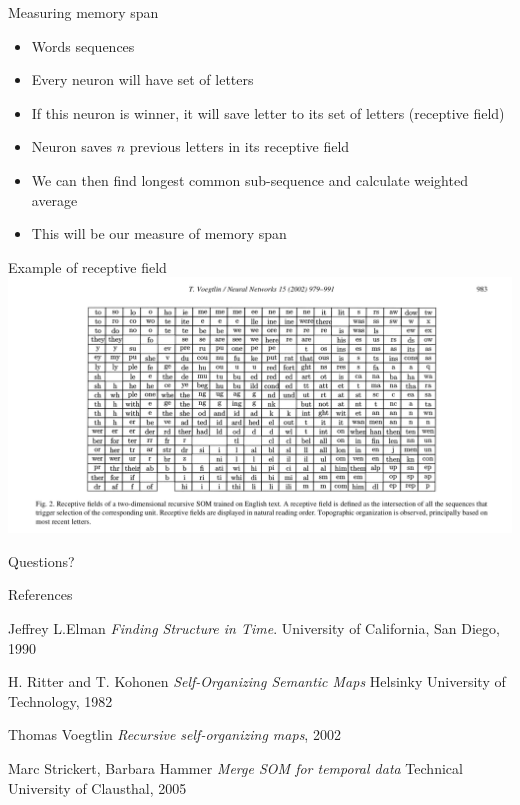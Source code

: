 \documentclass[10pt]{beamer}
\begin{document}
\begin{frame}[fragile]{Measuring memory span}

\begin{itemize}
\item Words sequences
\item Every neuron will have set of letters
\item If this neuron is winner, it will save letter to its set of letters (receptive field)
\item Neuron saves $n$ previous letters in its receptive field
\item We can then find longest common sub-sequence and calculate weighted average
\item This will be our measure of memory span
\end{itemize}

\end{frame}

\begin{frame}[fragile]{Example of receptive field}
\includegraphics[width=\textwidth]{receptive_field}
\end{frame}


{
\begin{frame}[standout]
  Questions?
\end{frame}
}

\appendix


\begin{frame}[allowframebreaks]{References}

  
  
  
\begin{thebibliography}{9}
Jeffrey L.Elman
\textit{Finding Structure in Time}. 
University of California, San Diego, 1990
 
H. Ritter and T. Kohonen
\textit{Self-Organizing Semantic Maps} 
Helsinky University of Technology, 1982
  
Thomas Voegtlin
\textit{Recursive self-organizing maps}, 2002
 
Marc Strickert, Barbara Hammer
\textit{Merge SOM for temporal data}
Technical University of Clausthal, 2005
 
\end{thebibliography}

\end{frame}
\end{document}
